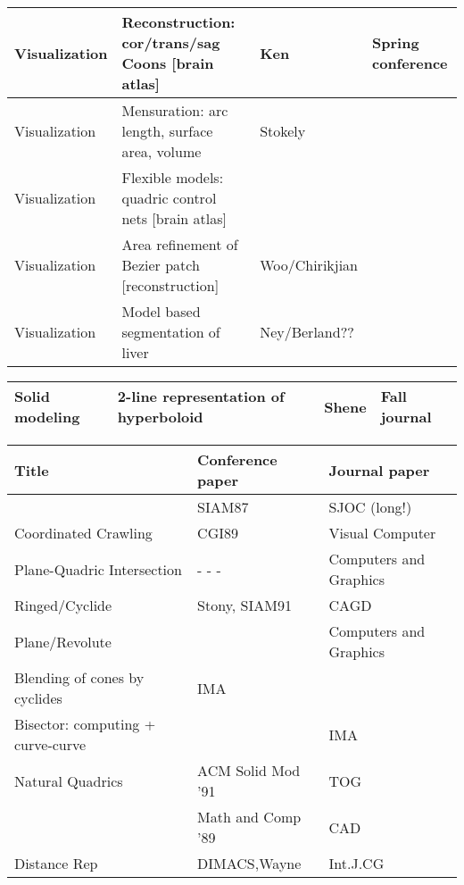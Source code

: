 \vspace{2in}

\begin{table}[h]
\centering
\begin{tabular}{|l|l|l|l|}
\hline
Visualization & Reconstruction: cor/trans/sag Coons [brain atlas] & Ken & Spring conference \\
\hline
Visualization & Mensuration: arc length, surface area, volume & Stokely & \\
\hline
Visualization & Flexible models: quadric control nets [brain atlas] & & \\
\hline
Visualization & Area refinement of Bezier patch [reconstruction] & Woo/Chirikjian & \\
\hline
Visualization & Model based segmentation of liver & Ney/Berland?? & \\
\hline
\end{tabular}
\end{table}

\clearpage

\begin{table}[h]
\centering
\begin{tabular}{|l|l|l|l|}
\hline
Solid modeling & 2-line representation of hyperboloid & Shene & Fall journal \\
\hline
\end{tabular}
\end{table}

\clearpage

\begin{table}
\centering
\begin{tabular}{|l|l|l|}
\hline
Title		& Conference paper	& Journal paper 
	\\ \hline \hline
\Comment{
Sorting		& SIAM87	& SJOC (long!) \\ \hline
Coordinated Crawling & CGI89	& Visual Computer \\ \hline
Plane-Quadric Intersection  & - - - & Computers and Graphics \\ \hline 
Ringed/Cyclide & Stony, SIAM91	& CAGD \\ \hline  
Plane/Revolute & & Computers and Graphics \\ \hline
Blending of cones by cyclides & IMA & \\ \hline
Bisector: computing + curve-curve & & IMA \\ \hline
Natural Quadrics & ACM Solid Mod '91	& TOG \\ \hline
}
%
Ruled Surface	& Math and Comp '89 & CAD \\ \hline
Distance Rep 	& DIMACS,Wayne	& Int.J.CG \\ \hline
\end{tabular}
\end{table}

